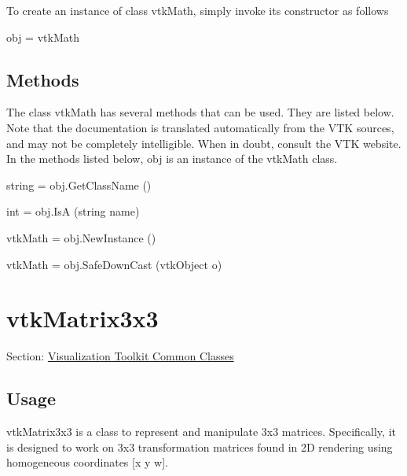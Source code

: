 To create an instance of class vtk\-Math, simply invoke its constructor as follows \begin{DoxyVerb}  obj = vtkMath
\end{DoxyVerb}
 \hypertarget{vtkwidgets_vtkxyplotwidget_Methods}{}\subsection{Methods}\label{vtkwidgets_vtkxyplotwidget_Methods}
The class vtk\-Math has several methods that can be used. They are listed below. Note that the documentation is translated automatically from the V\-T\-K sources, and may not be completely intelligible. When in doubt, consult the V\-T\-K website. In the methods listed below, {\ttfamily obj} is an instance of the vtk\-Math class. 
\begin{DoxyItemize}
\item {\ttfamily string = obj.\-Get\-Class\-Name ()}  
\item {\ttfamily int = obj.\-Is\-A (string name)}  
\item {\ttfamily vtk\-Math = obj.\-New\-Instance ()}  
\item {\ttfamily vtk\-Math = obj.\-Safe\-Down\-Cast (vtk\-Object o)}  
\end{DoxyItemize}\hypertarget{vtkcommon_vtkmatrix3x3}{}\section{vtk\-Matrix3x3}\label{vtkcommon_vtkmatrix3x3}
Section\-: \hyperlink{sec_vtkcommon}{Visualization Toolkit Common Classes} \hypertarget{vtkwidgets_vtkxyplotwidget_Usage}{}\subsection{Usage}\label{vtkwidgets_vtkxyplotwidget_Usage}
vtk\-Matrix3x3 is a class to represent and manipulate 3x3 matrices. Specifically, it is designed to work on 3x3 transformation matrices found in 2\-D rendering using homogeneous coordinates \mbox{[}x y w\mbox{]}.

